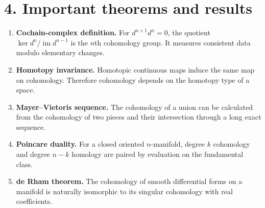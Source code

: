 \section*{4. Important theorems and results}
\begin{enumerate}[leftmargin=*,itemsep=0.35em]

\item \textbf{Cochain-complex definition.} For $d^{n+1}d^n=0$, the quotient $\ker d^n/\operatorname{im}d^{n-1}$ is the $n$th cohomology group. It measures consistent data modulo elementary changes. \cite{cohomology_theory_ref1}

\item \textbf{Homotopy invariance.} Homotopic continuous maps induce the same map on cohomology. Therefore cohomology depends on the homotopy type of a space. \cite{cohomology_theory_ref2}

\item \textbf{Mayer--Vietoris sequence.} The cohomology of a union can be calculated from the cohomology of two pieces and their intersection through a long exact sequence. \cite{cohomology_theory_ref2}

\item \textbf{Poincare duality.} For a closed oriented $n$-manifold, degree $k$ cohomology and degree $n-k$ homology are paired by evaluation on the fundamental class. \cite{cohomology_theory_ref3}

\item \textbf{de Rham theorem.} The cohomology of smooth differential forms on a manifold is naturally isomorphic to its singular cohomology with real coefficients. \cite{cohomology_theory_ref6}
\end{enumerate}

\theoryapplications
{}

